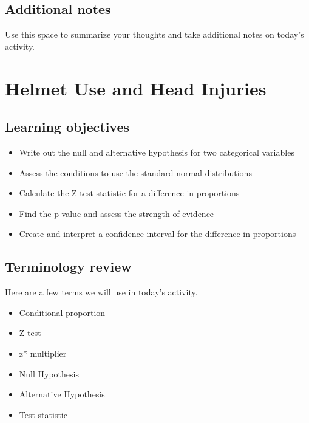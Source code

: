 \documentclass[
]{report}
\begin{document}
\vspace{1in}

\hypertarget{additional-notes}{%
\section{Additional notes}\label{additional-notes}}

Use this space to summarize your thoughts and take additional notes on today's activity.

\hypertarget{helmet-use-and-head-injuries}{%
\chapter{Helmet Use and Head Injuries}\label{helmet-use-and-head-injuries}}

\hypertarget{learning-objectives}{%
\section{Learning objectives}\label{learning-objectives}}

\begin{itemize}
\item
  Write out the null and alternative hypothesis for two categorical variables
\item
  Assess the conditions to use the standard normal distributions
\item
  Calculate the Z test statistic for a difference in proportions
\item
  Find the p-value and assess the strength of evidence
\item
  Create and interpret a confidence interval for the difference in proportions
\end{itemize}

\hypertarget{terminology-review}{%
\section{Terminology review}\label{terminology-review}}

Here are a few terms we will use in today's activity.

\begin{itemize}
\item
  Conditional proportion
\item
  Z test
\item
  z* multiplier
\item
  Null Hypothesis
\item
  Alternative Hypothesis
\item
  Test statistic
\end{itemize}
\end{document}
